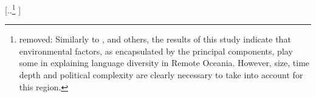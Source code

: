 \documentclass[unnumsec,webpdf,modern,medium]{oup-authoring-template}
\providecommand{\DIFdeltex}[1]{{\protect\color{red} [..\footnote{removed: #1} ]}} %
\providecommand{\DIFdel}[1]{\texorpdfstring{\DIFdeltex{#1}}{}} %
\begin{document}


\DIFdel{Similarly to \citet{gavin2012island}, \citet{hua2019ecological} and others, the results of this study indicate that environmental factors, as encapsulated by the principal components, play some in explaining language diversity in Remote Oceania. However, size, time depth and political complexity are clearly necessary to take into account for this region.
}%


\end{document}
